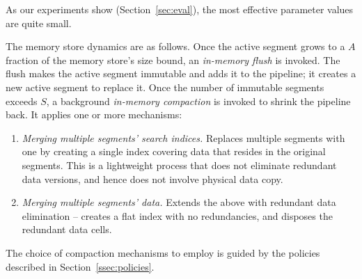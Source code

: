 \noindent
As our experiments show (Section~\ref{sec:eval}), the most effective parameter values are quite small.

The memory store dynamics are as follows. 
Once the active segment grows to a $A$ fraction of the memory store's size bound, an \emph{in-memory flush} is invoked.
The  flush makes the active segment immutable and adds it to the pipeline; it creates a new active segment to replace it. 
Once the number of immutable segments exceeds $S$, a background \emph{in-memory compaction} is invoked to shrink
the pipeline back. It applies one or more mechanisms: 
\begin{enumerate}
\item {\em Merging multiple segments' search indices.} 
Replaces multiple segments with one by creating a single index covering data that resides 
in the original segments. This is a lightweight process that does not eliminate redundant 
data versions, and hence does not involve physical data copy. 
\item  {\em Merging multiple segments' data.} Extends the above with redundant data elimination --
creates a flat index with no redundancies, and disposes the redundant data cells. 
\end{enumerate} 
The choice of compaction mechanisms to employ is guided by the policies described in Section~\ref{ssec:policies}.

